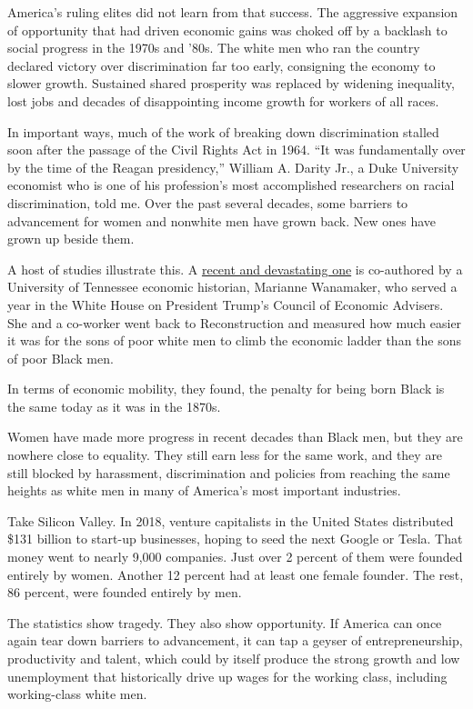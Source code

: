 America's ruling elites did not learn from that success. The aggressive
expansion of opportunity that had driven economic gains was choked off
by a backlash to social progress in the 1970s and '80s. The white men
who ran the country declared victory over discrimination far too early,
consigning the economy to slower growth. Sustained shared prosperity was
replaced by widening inequality, lost jobs and decades of disappointing
income growth for workers of all races.

In important ways, much of the work of breaking down discrimination
stalled soon after the passage of the Civil Rights Act in 1964. ``It was
fundamentally over by the time of the Reagan presidency,'' William A.
Darity Jr., a Duke University economist who is one of his profession's
most accomplished researchers on racial discrimination, told me. Over
the past several decades, some barriers to advancement for women and
nonwhite men have grown back. New ones have grown up beside them.

A host of studies illustrate this. A
\href{http://web.utk.edu/~mwanamak/Intergen_NBER.pdf}{recent and
devastating one} is co-authored by a University of Tennessee economic
historian, Marianne Wanamaker, who served a year in the White House on
President Trump's Council of Economic Advisers. She and a co-worker went
back to Reconstruction and measured how much easier it was for the sons
of poor white men to climb the economic ladder than the sons of poor
Black men.

In terms of economic mobility, they found, the penalty for being born
Black is the same today as it was in the 1870s.

Women have made more progress in recent decades than Black men, but they
are nowhere close to equality. They still earn less for the same work,
and they are still blocked by harassment, discrimination and policies
from reaching the same heights as white men in many of America's most
important industries.

Take Silicon Valley. In 2018, venture capitalists in the United States
distributed \$131 billion to start-up businesses, hoping to seed the
next Google or Tesla. That money went to nearly 9,000 companies. Just
over 2 percent of them were founded entirely by women. Another 12
percent had at least one female founder. The rest, 86 percent, were
founded entirely by men.

The statistics show tragedy. They also show opportunity. If America can
once again tear down barriers to advancement, it can tap a geyser of
entrepreneurship, productivity and talent, which could by itself produce
the strong growth and low unemployment that historically drive up wages
for the working class, including working-class white men.

